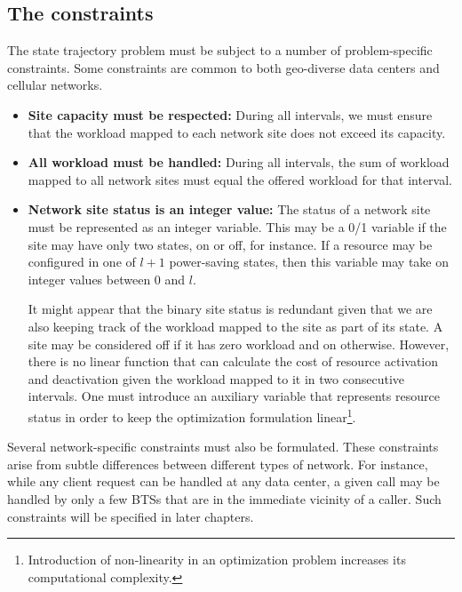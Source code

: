 \subsection{The constraints}
\label{subsec:framework:constraints} %
The state trajectory problem must be subject to a number of problem-specific constraints. Some constraints are common to both geo-diverse data centers and cellular networks. 

\begin{itemize}
\item \textbf{Site capacity must be respected:} During all intervals, we must ensure that the workload mapped to each network site does not exceed its capacity.
\item \textbf{All workload must be handled:} During all intervals, the sum of workload mapped to all network sites must equal the offered workload for that interval.
\item \textbf{Network site status is an integer value:} The status of a network site must be represented as an integer variable. This may be a 0/1 variable if the site may have only two states, on or off, for instance. If a resource may be configured in one of $l+1$ power-saving states, then this variable may take on integer values between $0$ and $l$. 

It might appear that the binary site status is redundant given that we are also keeping track of the workload mapped to the site as part of its state. A site may be considered off if it has zero workload and on otherwise. However, there is no linear function that can calculate the cost of resource activation and deactivation given the workload mapped to it in two consecutive intervals. One must introduce an auxiliary variable that represents resource status in order to keep the optimization formulation linear\footnote{Introduction of non-linearity in an optimization problem increases its computational complexity.}. 
\end{itemize}

Several network-specific constraints must also be formulated. These constraints arise from subtle differences between different types of network. For instance, while any client request can be handled at any data center, a given call may be handled by only a few BTSs that are in the immediate vicinity of a caller. Such constraints will be specified in later chapters.


